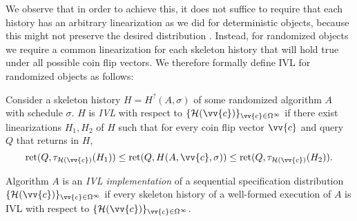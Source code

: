 We observe that in order to achieve this, it does not suffice to require that each history has an
arbitrary linearization as we did for deterministic objects, because this might not preserve the
desired distribution . Instead, for randomized objects we require a common linearization for each
skeleton history that will hold true under all possible coin flip vectors.
We therefore formally
define IVL for randomized objects as follows:




\begin{definition}
  Consider a skeleton history $H=H^?(A, \sigma)$ of some
  randomized algorithm $A$ with schedule $\sigma$.
  $H$ is \emph{IVL} with respect to $\{\mathcal{H}(\vv{c})\}_{\vv{c} \in \Omega^\infty}$ if there exist
  linearizations $H_1, H_2$ of $H$ such that for every coin flip vector $\vv{c}$ and query $Q$
  that returns in $H$,
  \[\text{ret}(Q, \tau_{\mathcal{H}(\vv{c})}(H_1)) \leq \text{ret}(Q, H(A, \vv{c}, \sigma)) \leq \text{ret}(Q, \tau_{\mathcal{H}(\vv{c})}(H_2)). \]

  Algorithm $A$ is an \emph{IVL implementation} of a sequential specification
  distribution $\{\mathcal{H}(\vv{c})\}_{\vv{c} \in \Omega^\infty}$ if every skeleton
  history of a well-formed execution of $A$ is IVL with
  respect to $\{\mathcal{H}(\vv{c})\}_{\vv{c} \in \Omega^\infty}$.
  \label{ivl-def:sivl}
\end{definition}

